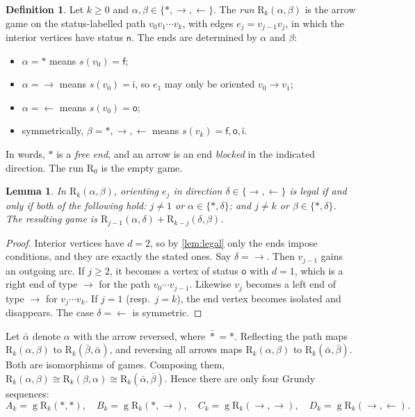 \documentclass[11pt]{amsart}
\newtheorem{lemma}[theorem]{Lemma}
\theoremstyle{definition}
\newtheorem{definition}[theorem]{Definition}
\theoremstyle{remark}
\newcommand{\gv}{\operatorname{g}}           %
\newcommand{\sn}{\mathsf{n}}
\newcommand{\si}{\mathsf{i}}
\newcommand{\so}{\mathsf{o}}
\newcommand{\sff}{\mathsf{f}}
\newcommand{\R}{\mathrm{R}}
\newcommand{\free}{\ast}
\newcommand{\rgt}{\rightarrow}
\newcommand{\lft}{\leftarrow}
\begin{document}
\begin{definition}\label{def:run}
Let $k\ge 0$ and $\alpha,\beta\in\{\free,\rgt,\lft\}$. The \emph{run} $\R_k(\alpha,\beta)$ is the arrow game on the status-labelled path $v_0v_1\cdots v_k$, with edges $e_j=v_{j-1}v_j$, in which the interior vertices have status $\sn$. The ends are determined by $\alpha$ and $\beta$:
\begin{itemize}[leftmargin=*]
\item $\alpha=\free$ means $s(v_0)=\sff$;
\item $\alpha={\rgt}$ means $s(v_0)=\si$, so $e_1$ may only be oriented $v_0\to v_1$;
\item $\alpha={\lft}$ means $s(v_0)=\so$;
\item symmetrically, $\beta=\free,\rgt,\lft$ means $s(v_k)=\sff,\so,\si$.
\end{itemize}
In words, $\free$ is a \emph{free end}, and an arrow is an end \emph{blocked} in the indicated direction. The run $\R_0$ is the empty game.
\end{definition}

\begin{lemma}\label{lem:runmoves}
In $\R_k(\alpha,\beta)$, orienting $e_j$ in direction $\delta\in\{\rgt,\lft\}$ is legal if and only if both of the following hold: $j\ne1$ or $\alpha\in\{\free,\delta\}$; and $j\ne k$ or $\beta\in\{\free,\delta\}$. The resulting game is $\R_{j-1}(\alpha,\delta)+\R_{k-j}(\delta,\beta)$.
\end{lemma}

\begin{proof}
Interior vertices have $d=2$, so by \cref{lem:legal} only the ends impose conditions, and they are exactly the stated ones. Say $\delta={\rgt}$. Then $v_{j-1}$ gains an outgoing arc. If $j\ge2$, it becomes a vertex of status $\so$ with $d=1$, which is a right end of type $\rgt$ for the path $v_0\cdots v_{j-1}$. Likewise $v_j$ becomes a left end of type $\rgt$ for $v_j\cdots v_k$. If $j=1$ (resp.\ $j=k$), the end vertex becomes isolated and disappears. The case $\delta={\lft}$ is symmetric.
\end{proof}

Let $\bar\alpha$ denote $\alpha$ with the arrow reversed, where $\bar\free=\free$. Reflecting the path maps $\R_k(\alpha,\beta)$ to $\R_k(\bar\beta,\bar\alpha)$, and reversing all arrows maps $\R_k(\alpha,\beta)$ to $\R_k(\bar\alpha,\bar\beta)$. Both are isomorphisms of games. Composing them, $\R_k(\alpha,\beta)\cong\R_k(\beta,\alpha)\cong\R_k(\bar\alpha,\bar\beta)$. Hence there are only four Grundy sequences:
\[
  A_k=\gv\R_k(\free,\free),\quad B_k=\gv\R_k(\free,\rgt),\quad C_k=\gv\R_k(\rgt,\rgt),\quad D_k=\gv\R_k(\rgt,\lft).
\]
\end{document}

